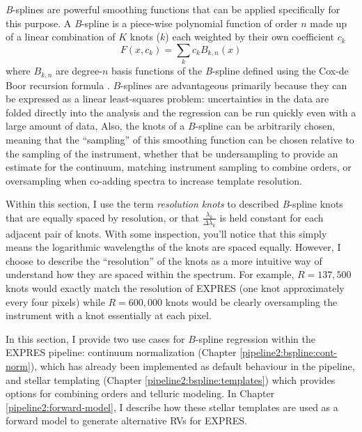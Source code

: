 \textit{B}-splines \citep{de_boor_practical_1978, dierckx_curve_1995, eilers_flexible_1996} are powerful smoothing functions that can be applied specifically for this purpose. A \textit{B}-spline is a piece-wise polynomial function of order $n$ made up of a linear combination of $K$ knots ($k$) each weighted by their own coefficient $c_k$
\begin{equation}
    F(x,{c_k}) = \sum_k {c_k B_{k,n}(x)}
\end{equation}
where $B_{k,n}$ are degree-$n$ basis functions of the \textit{B}-spline defined using the Cox-de Boor recursion formula \citep{de_boor_practical_1978}. $B$-splines are advantageous primarily because they can be expressed as a linear least-squares problem: uncertainties in the data are folded directly into the analysis and the regression can be run quickly even with a large amount of data, Also, the knots of a $B$-spline can be arbitrarily chosen, meaning that the ``sampling'' of this smoothing function can be chosen relative to the sampling of the instrument, whether that be undersampling to provide an estimate for the continuum, matching instrument sampling to combine orders, or oversampling when co-adding spectra to increase template resolution.

Within this section, I use the term \textit{resolution knots} to described \textit{B}-spline knots that are equally spaced by resolution, or that $\frac{\lambda_k}{\Delta \lambda_k}$ is held constant for each adjacent pair of knots. With some inspection, you'll notice that this simply means the logarithmic wavelengths of the knots are spaced equally. However, I choose to describe the ``resolution'' of the knots as a more intuitive way of understand how they are spaced within the spectrum. For example, $R=137,500$ knots would exactly match the resolution of EXPRES (one knot approximately every four pixels) while $R=600,000$ knots would be clearly oversampling the instrument with a knot essentially at each pixel.

In this section, I provide two use cases for $B$-spline regression within the EXPRES pipeline: continuum normalization (Chapter \ref{pipeline2:bspline:cont-norm}), which has already been implemented as default behaviour in the pipeline, and stellar templating (Chapter \ref{pipeline2:bspline:templates}) which provides options for combining orders and telluric modeling. In Chapter \ref{pipeline2:forward-model}, I describe how these stellar templates are used as a forward model to generate alternative RVs for EXPRES.

